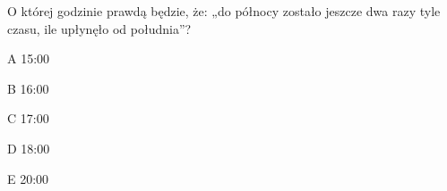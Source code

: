 \begin{tresc}
O której godzinie prawdą będzie, że: „do północy zostało jeszcze dwa razy tyle czasu, ile upłynęło od południa”?
\end{tresc}
\begin{wariant}{A} 15:00 \end{wariant}
\begin{wariant}{B} 16:00 \end{wariant}
\begin{wariant}{C} 17:00 \end{wariant}
\begin{wariant}{D} 18:00 \end{wariant}
\begin{wariant}{E} 20:00 \end{wariant}
